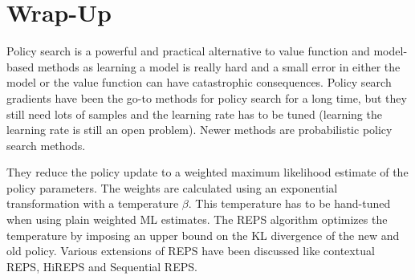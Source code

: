	\section{Wrap-Up}
		Policy search is a powerful and practical alternative to value function and model-based methods as learning a model is really hard and a small error in either the model or the value function can have catastrophic consequences. Policy search gradients have been the go-to methods for policy search for a long time, but they still need lots of samples and the learning rate has to be tuned (learning the learning rate is still an open problem). Newer methods are probabilistic policy search methods.

		They reduce the policy update to a weighted maximum likelihood estimate of the policy parameters. The weights are calculated using an exponential transformation with a temperature \(\beta\). This temperature has to be hand-tuned when using plain weighted ML estimates. The REPS algorithm optimizes the temperature by imposing an upper bound on the KL divergence of the new and old policy. Various extensions of REPS have been discussed like contextual REPS, HiREPS and Sequential REPS.


